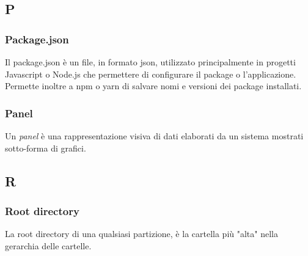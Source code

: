 \subsection*{P}

	\subsubsection*{Package.json} 
	\label{sec:package}
Il package.json è un file, in formato json, utilizzato principalmente in progetti Javascript o Node.js che permettere di configurare il package o l'applicazione. Permette inoltre a npm o yarn di salvare nomi e versioni dei package installati.

	\subsubsection*{Panel} 
	\label{sec:panel}
Un \emph{panel} è una rappresentazione visiva di dati elaborati da un sistema mostrati sotto-forma di grafici.


\subsection*{R}

	\subsubsection*{Root directory}
	\label{sec:rootdirectory}
La root directory di una qualsiasi partizione, è la cartella più "alta" nella gerarchia delle cartelle.




